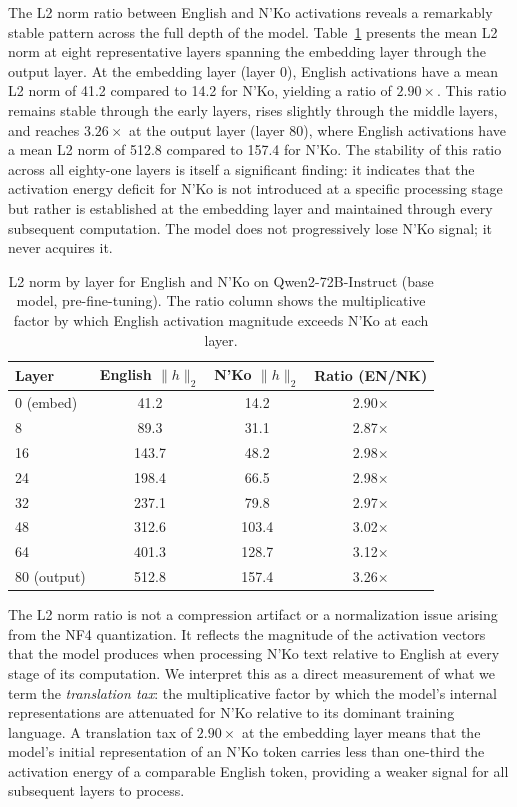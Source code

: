 \documentclass[11pt]{article}
\newcommand{\nko}{N'Ko}
\begin{document}
The L2 norm ratio between English and \nko{} activations reveals a remarkably stable pattern across the full depth of the model. Table~\ref{tab:l2norm} presents the mean L2 norm at eight representative layers spanning the embedding layer through the output layer. At the embedding layer (layer 0), English activations have a mean L2 norm of 41.2 compared to 14.2 for \nko{}, yielding a ratio of $2.90\times$. This ratio remains stable through the early layers, rises slightly through the middle layers, and reaches $3.26\times$ at the output layer (layer 80), where English activations have a mean L2 norm of 512.8 compared to 157.4 for \nko{}. The stability of this ratio across all eighty-one layers is itself a significant finding: it indicates that the activation energy deficit for \nko{} is not introduced at a specific processing stage but rather is established at the embedding layer and maintained through every subsequent computation. The model does not progressively lose \nko{} signal; it never acquires it.

\begin{table}[ht]
\centering
\caption{L2 norm by layer for English and \nko{} on Qwen2-72B-Instruct (base model, pre-fine-tuning). The ratio column shows the multiplicative factor by which English activation magnitude exceeds \nko{} at each layer.}
\label{tab:l2norm}
\begin{tabular}{@{}lccc@{}}
\toprule
Layer & English $\|h\|_2$ & \nko{} $\|h\|_2$ & Ratio (EN/NK) \\
\midrule
0 (embed) & 41.2 & 14.2 & 2.90$\times$ \\
8 & 89.3 & 31.1 & 2.87$\times$ \\
16 & 143.7 & 48.2 & 2.98$\times$ \\
24 & 198.4 & 66.5 & 2.98$\times$ \\
32 & 237.1 & 79.8 & 2.97$\times$ \\
48 & 312.6 & 103.4 & 3.02$\times$ \\
64 & 401.3 & 128.7 & 3.12$\times$ \\
80 (output) & 512.8 & 157.4 & 3.26$\times$ \\
\bottomrule
\end{tabular}
\end{table}

The L2 norm ratio is not a compression artifact or a normalization issue arising from the NF4 quantization. It reflects the magnitude of the activation vectors that the model produces when processing \nko{} text relative to English at every stage of its computation. We interpret this as a direct measurement of what we term the \emph{translation tax}: the multiplicative factor by which the model's internal representations are attenuated for \nko{} relative to its dominant training language. A translation tax of $2.90\times$ at the embedding layer means that the model's initial representation of an \nko{} token carries less than one-third the activation energy of a comparable English token, providing a weaker signal for all subsequent layers to process.
\end{document}
